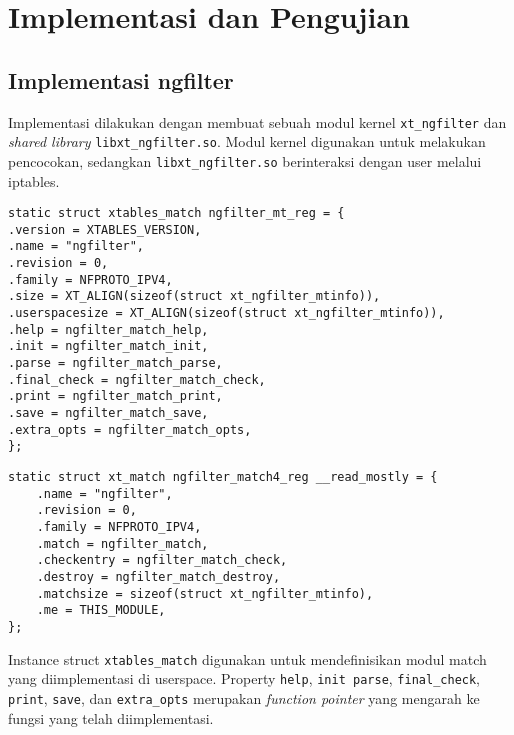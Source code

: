 \chapter{Implementasi dan Pengujian}

\section{Implementasi ngfilter}

Implementasi dilakukan dengan membuat sebuah modul kernel \verb|xt_ngfilter| dan  \textit{shared library} \verb|libxt_ngfilter.so|.
Modul kernel digunakan untuk melakukan pencocokan, sedangkan \verb|libxt_ngfilter.so| berinteraksi dengan user melalui iptables.

\begin{lstlisting}
static struct xtables_match ngfilter_mt_reg = {
.version = XTABLES_VERSION,
.name = "ngfilter",
.revision = 0,
.family = NFPROTO_IPV4,
.size = XT_ALIGN(sizeof(struct xt_ngfilter_mtinfo)),
.userspacesize = XT_ALIGN(sizeof(struct xt_ngfilter_mtinfo)),
.help = ngfilter_match_help,
.init = ngfilter_match_init,
.parse = ngfilter_match_parse,
.final_check = ngfilter_match_check,
.print = ngfilter_match_print,
.save = ngfilter_match_save,
.extra_opts = ngfilter_match_opts,
};
\end{lstlisting}

\begin{lstlisting}
static struct xt_match ngfilter_match4_reg __read_mostly = {
	.name = "ngfilter",
	.revision = 0,
	.family = NFPROTO_IPV4,
	.match = ngfilter_match,
	.checkentry = ngfilter_match_check,
	.destroy = ngfilter_match_destroy,
	.matchsize = sizeof(struct xt_ngfilter_mtinfo),
	.me = THIS_MODULE,
};
\end{lstlisting}

Instance struct \verb|xtables_match| digunakan untuk mendefinisikan modul match yang diimplementasi di userspace.
Property \verb|help|, \verb|init parse|, \verb|final_check|, \verb|print|, \verb|save|, dan \verb|extra_opts| merupakan \textit{function pointer} yang mengarah ke fungsi yang telah diimplementasi.

